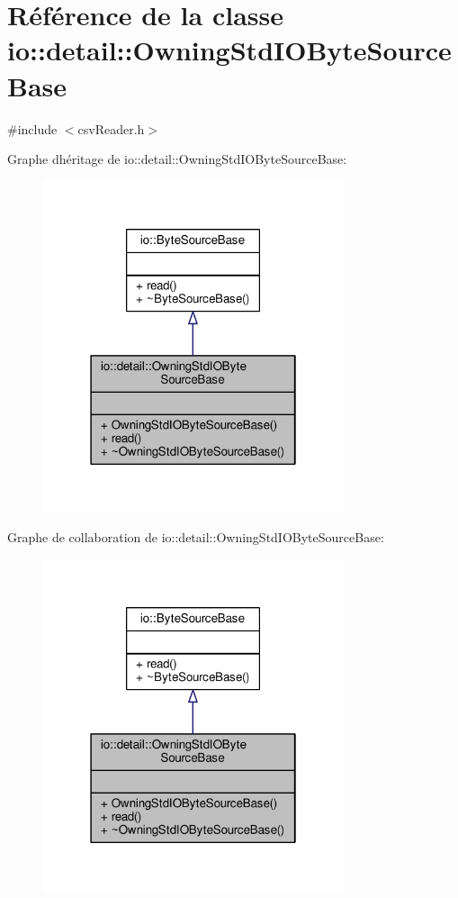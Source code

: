 \hypertarget{classio_1_1detail_1_1OwningStdIOByteSourceBase}{}\section{Référence de la classe io\+:\+:detail\+:\+:Owning\+Std\+I\+O\+Byte\+Source\+Base}
\label{classio_1_1detail_1_1OwningStdIOByteSourceBase}


{\ttfamily \#include $<$csv\+Reader.\+h$>$}



Graphe d\textquotesingle{}héritage de io\+:\+:detail\+:\+:Owning\+Std\+I\+O\+Byte\+Source\+Base\+:
\nopagebreak
\begin{figure}[H]
\begin{center}
\leavevmode
\includegraphics[width=250pt]{classio_1_1detail_1_1OwningStdIOByteSourceBase__inherit__graph}
\end{center}
\end{figure}


Graphe de collaboration de io\+:\+:detail\+:\+:Owning\+Std\+I\+O\+Byte\+Source\+Base\+:
\nopagebreak
\begin{figure}[H]
\begin{center}
\leavevmode
\includegraphics[width=250pt]{classio_1_1detail_1_1OwningStdIOByteSourceBase__coll__graph}
\end{center}
\end{figure}
